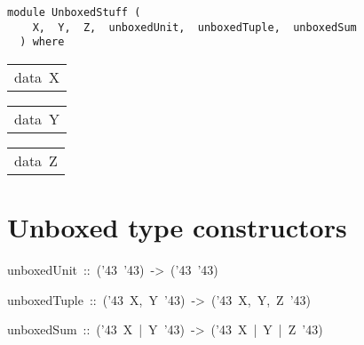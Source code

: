 \label{module:UnboxedStuff}
\haddockbeginheader
{\haddockverb\begin{verbatim}
module UnboxedStuff (
    X,  Y,  Z,  unboxedUnit,  unboxedTuple,  unboxedSum
  ) where\end{verbatim}}
\haddockendheader

\begin{haddockdesc}
\item[\begin{tabular}{@{}l}
data\ X
\end{tabular}]
\end{haddockdesc}
\begin{haddockdesc}
\item[\begin{tabular}{@{}l}
data\ Y
\end{tabular}]
\end{haddockdesc}
\begin{haddockdesc}
\item[\begin{tabular}{@{}l}
data\ Z
\end{tabular}]
\end{haddockdesc}
\section{Unboxed type constructors}
\begin{haddockdesc}
\item[
unboxedUnit\ ::\ ({\char '43}\ {\char '43})\ ->\ ({\char '43}\ {\char '43})
]
\item[
unboxedTuple\ ::\ ({\char '43}\ X,\ Y\ {\char '43})\ ->\ ({\char '43}\ X,\ Y,\ Z\ {\char '43})
]
\item[
unboxedSum\ ::\ ({\char '43}\ X\ |\ Y\ {\char '43})\ ->\ ({\char '43}\ X\ |\ Y\ |\ Z\ {\char '43})
]
\end{haddockdesc}